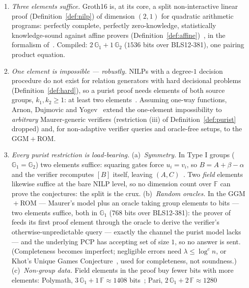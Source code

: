 \documentclass{aicr-conjecture}
\newcommand{\Gone}{\mathbb{G}_1}
\newcommand{\Gtwo}{\mathbb{G}_2}
\newcommand{\FF}{\mathbb{F}}
\begin{document}
\begin{enumerate}[label=(F\arabic*),ref=F\arabic*,leftmargin=*,itemsep=1pt,topsep=2pt]
\item\label{F1} \emph{Three elements suffice.}  Groth16 is, at its
  core, a split non-interactive linear proof
  (Definition~\ref{def:nilp}) of dimension $(2,1)$ for quadratic
  arithmetic programs: perfectly complete, perfectly zero-knowledge,
  statistically knowledge-sound against affine provers
  (Definition~\ref{def:affine})~\cite{Gro16}, in the formalism
  of~\cite{BCIOP13}.  Compiled: $2\,\Gone + 1\,\Gtwo$ ($1536$ bits
  over BLS12-381), one pairing product equation.
\item\label{F2} \emph{One element is impossible --- robustly.}  NILPs
  with a degree-$1$ decision procedure do not exist for relation
  generators with hard decisional problems
  (Definition~\ref{def:hard}), so a purist proof needs elements of
  both source groups, $k_1,k_2 \geq 1$: at least two
  elements~\cite[Thms.~3--4]{Gro16}.  Assuming one-way functions,
  Arnon, Dujmovic and Yogev~\cite{ADY25} extend the one-element
  impossibility to \emph{arbitrary} Maurer-generic verifiers
  (restriction (iii) of Definition~\ref{def:purist} dropped) and,
  for non-adaptive verifier queries and oracle-free setups, to the
  GGM${}+{}$ROM.
\item\label{F3} \emph{Every purist restriction is load-bearing.}
  (a)~\emph{Symmetry.}  In Type I groups ($\Gone = \Gtwo$) two
  elements suffice: squaring gates force $u_i = v_i$, so
  $B = A + \beta - \alpha$ and the verifier recomputes $[B]$ itself,
  leaving $(A,C)$~\cite[Sect.~3.1]{Gro16}.  Two \emph{field} elements
  likewise suffice at the bare NILP level, so no dimension count
  over $\FF$ can prove the conjectures: the split is the crux.
  (b)~\emph{Random oracles.}  In the GGM${}+{}$ROM --- Maurer's
  model plus an oracle taking group elements to bits --- two
  elements suffice, both in $\Gone$ ($768$ bits over BLS12-381): the
  prover of~\cite{ADY25} feeds its first proof element through the
  oracle to derive the verifier's otherwise-unpredictable query ---
  exactly the channel the purist model lacks --- and the underlying
  PCP has accepting set of size $1$, so no answer is sent.
  (Completeness becomes imperfect; negligible errors need
  $\lambda \leq \log^c n$, or Khot's Unique Games
  Conjecture~\cite{Kho02}, used for completeness, not soundness.)
  (c)~\emph{Non-group data.}  Field elements in the proof buy fewer
  bits with more elements: Polymath, $3\,\Gone + 1\,\FF \approx 1408$
  bits~\cite{Lip24}; Pari, $2\,\Gone + 2\,\FF \approx 1280$

\end{enumerate}
\end{document}
